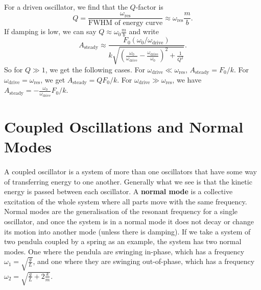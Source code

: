 \documentclass[../classical_mechanics.tex]{subfiles}
\begin{document}
        \paragraph{}
        For a driven oscillator, we find that the $Q$-factor is
        \begin{equation}
            Q=\frac{\omega_\text{res}}{\text{FWHM of energy curve}}\approx\omega_\text{res}\frac{m}{b}.
        \end{equation}
        If damping is low, we can say $Q\approx\omega_0\frac{m}{b}$ and write
        \begin{equation}
            A_\text{steady}\approx\frac{F_0(\omega_0/\omega_\text{drive})}{k\sqrt{\left(\frac{\omega_0}{\omega_\text{drive}}-\frac{\omega_\text{drive}}{\omega_0}\right)^2+\frac{1}{Q^2}}}.
        \end{equation}
        So for $Q\gg 1$, we get the following cases.
        For $\omega_\text{drive}\ll\omega_\text{res}$, $A_\text{steady}=F_0/k$.
        For $\omega_\text{drive}=\omega_\text{res}$, we get $A_\text{steady}=QF_0/k$.
        For $\omega_\text{drive}\gg\omega_\text{res}$, we have $A_\text{steady}=-\frac{\omega_0}{\omega_\text{drive}}F_0/k$.

    \section{Coupled Oscillations and Normal Modes}
        \paragraph{}
        A coupled oscillator is a system of more than one oscillators that have some way of transferring energy to one another.
        Generally what we see is that the kinetic energy is passed between each oscillator.
        A \textbf{normal mode} is a collective excitation of the whole system where all parts move with the same frequency.
        Normal modes are the generalisation of the resonant frequency for a single oscillator, and once the system is in a normal mode it does not decay or change its motion into another mode (unless there is damping).
        If we take a system of two pendula coupled by a spring as an example, the system has two normal modes.
        One where the pendula are swinging in-phase, which has a frequency $\omega_1=\sqrt{\frac{g}{L}}$, and one where they are swinging out-of-phase, which has a frequency $\omega_2=\sqrt{\frac{g}{L}+2\frac{k}{m}}$.
\end{document}
